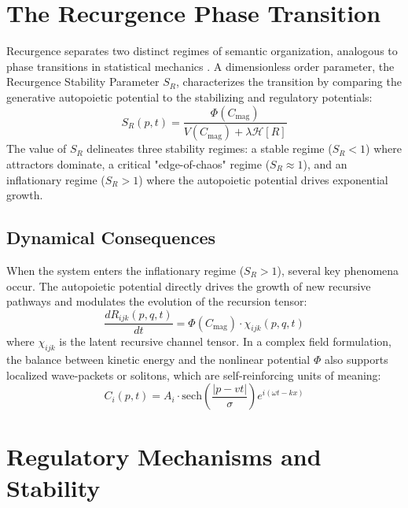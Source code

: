 \section{The Recurgence Phase Transition}

Recurgence separates two distinct regimes of semantic organization, analogous to phase transitions in statistical mechanics \autocite{Landau1937, Stanley1971, Goldenfeld1992}. A dimensionless order parameter, the Recurgence Stability Parameter \(S_R\), characterizes the transition by comparing the generative autopoietic potential to the stabilizing and regulatory potentials:
\begin{equation}
S_R(p,t) = \frac{\Phi(C_{\mathrm{mag}})}{V(C_{\mathrm{mag}}) + \lambda \mathcal{H}[R]}
\end{equation}
The value of \(S_R\) delineates three stability regimes: a stable regime (\(S_R < 1\)) where attractors dominate, a critical "edge-of-chaos" regime (\(S_R \approx 1\)), and an inflationary regime (\(S_R > 1\)) where the autopoietic potential drives exponential growth.

\subsection{Dynamical Consequences}

When the system enters the inflationary regime (\(S_R > 1\)), several key phenomena occur. The autopoietic potential directly drives the growth of new recursive pathways and modulates the evolution of the recursion tensor:
\begin{equation}
\frac{dR_{ijk}(p,q,t)}{dt} = \Phi(C_{\mathrm{mag}}) \cdot \chi_{ijk}(p,q,t)
\end{equation}
where \(\chi_{ijk}\) is the latent recursive channel tensor. In a complex field formulation, the balance between kinetic energy and the nonlinear potential \(\Phi\) also supports localized wave-packets or solitons, which are self-reinforcing units of meaning:
\begin{equation}
C_i(p,t) = A_i \cdot \text{sech}\left(\frac{|p-vt|}{\sigma}\right) e^{i(\omega t - kx)}
\end{equation}

\section{Regulatory Mechanisms and Stability}

